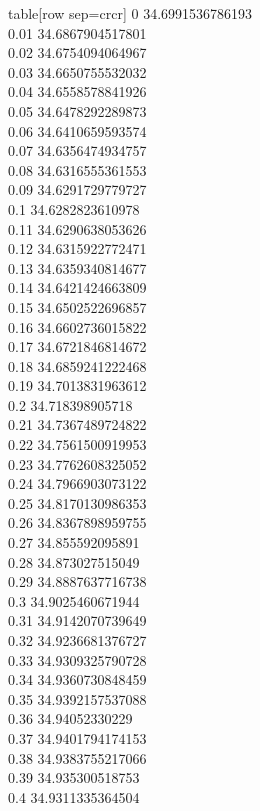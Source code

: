   table[row sep=crcr]{%
0	34.6991536786193\\
0.01	34.6867904517801\\
0.02	34.6754094064967\\
0.03	34.6650755532032\\
0.04	34.6558578841926\\
0.05	34.6478292289873\\
0.06	34.6410659593574\\
0.07	34.6356474934757\\
0.08	34.6316555361553\\
0.09	34.6291729779727\\
0.1	34.6282823610978\\
0.11	34.6290638053626\\
0.12	34.6315922772471\\
0.13	34.6359340814677\\
0.14	34.6421424663809\\
0.15	34.6502522696857\\
0.16	34.6602736015822\\
0.17	34.6721846814672\\
0.18	34.6859241222468\\
0.19	34.7013831963612\\
0.2	34.718398905718\\
0.21	34.7367489724822\\
0.22	34.7561500919953\\
0.23	34.7762608325052\\
0.24	34.7966903073122\\
0.25	34.8170130986353\\
0.26	34.8367898959755\\
0.27	34.855592095891\\
0.28	34.873027515049\\
0.29	34.8887637716738\\
0.3	34.9025460671944\\
0.31	34.9142070739649\\
0.32	34.9236681376727\\
0.33	34.9309325790728\\
0.34	34.9360730848459\\
0.35	34.9392157537088\\
0.36	34.94052330229\\
0.37	34.9401794174153\\
0.38	34.9383755217066\\
0.39	34.935300518753\\
0.4	34.9311335364504\\
}

